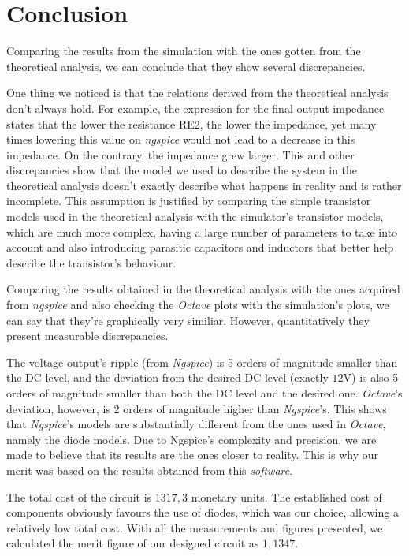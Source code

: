 \section{Conclusion}
\label{sec:conclusion}

Comparing the results from the simulation with the ones gotten from the theoretical analysis, we can conclude that they show several discrepancies.

One thing we noticed is that the relations derived from the theoretical analysis don't always hold. For example, the expression for the final output impedance states that the lower the resistance RE2, the lower the impedance, yet many times lowering this value on \textit{ngspice} would not lead
to a decrease in this impedance. On the contrary, the impedance grew larger. This and other discrepancies show that the model we used to describe the system in the theoretical analysis doesn't exactly describe what happens in reality and is rather incomplete. This assumption is justified by comparing
the simple transistor models used in the theoretical analysis with the simulator's transistor models, which are much more complex, having a large number of parameters to take into account and also introducing parasitic capacitors and inductors that better help describe the transistor's behaviour.


Comparing the results obtained in the theoretical analysis  with the ones acquired from \textit{ngspice} and also checking the \textit{Octave} plots with the simulation's plots, we can say that they're graphically very similiar. However, quantitatively they present measurable discrepancies.

The voltage output's ripple (from \textit{Ngspice}) is 5 orders of magnitude smaller than the DC level, and the deviation from the desired DC level (exactly $12$V) is also 5 orders of magnitude smaller than both the DC level and the desired one.
\textit{Octave}'s deviation, however, is 2 orders of magnitude higher than \textit{Ngspice}'s. This shows that \textit{Ngspice}'s models are substantially different from the ones used in \textit{Octave}, namely the diode models. Due to Ngspice's complexity and precision, we are made to believe
 that its results are the ones closer to reality. This is why our merit was based on the results obtained from this \textit{software}.\par

The total cost of the circuit is $1317,3$ monetary units. The established cost of components obviously favours the use of diodes, which was our choice, allowing a relatively low total cost.
With all the measurements and figures presented, we calculated the merit figure of our designed circuit as $1,1347$.
